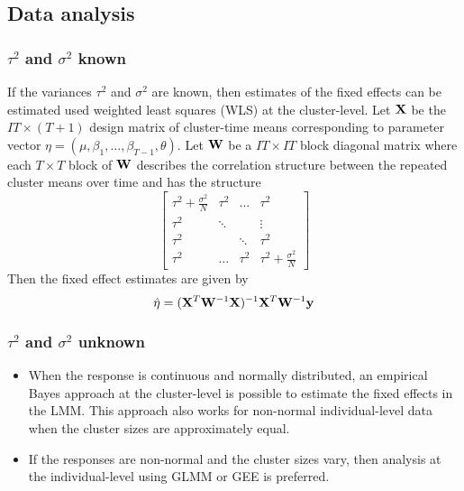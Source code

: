 \documentclass[10pt]{article}
\begin{document}
\subsection{Data analysis}

\subsubsection{$\tau^2$ and $\sigma^2$ known}

If the variances $\tau^2$ and $\sigma^2$ are known, then estimates of the fixed effects can be estimated used weighted least squares (WLS) at the cluster-level. Let $\mathbf{X}$ be the $IT\times(T+1)$ design matrix of cluster-time means corresponding to parameter vector $\eta=(\mu,\beta_1,\ldots,\beta_{T-1},\theta)$. Let $\mathbf{W}$ be a $IT\times IT$ block diagonal matrix where each $T\times T$ block of $\mathbf{W}$ describes the correlation structure between the repeated cluster means over time and has the structure
\[
\begin{bmatrix}
\tau^2 + \frac{\sigma^2}{N} & \tau^2 & \ldots & \tau^2 \\
\tau^2 & \ddots & & \vdots \\
\tau^2 & & \ddots & \tau^2 \\
\tau^2 & \ldots & \tau^2 & \tau^2 + \frac{\sigma^2}{N}
\end{bmatrix}
\]
Then the fixed effect estimates are given by
\[
\hat{\eta} = (\mathbf{X}^T\mathbf{W}^{-1}\mathbf{X})^{-1}\mathbf{X}^T\mathbf{W}^{-1}\mathbf{y}
\]

\subsubsection{$\tau^2$ and $\sigma^2$ unknown}

\begin{itemize}

\item
When the response is continuous and normally distributed, an empirical Bayes approach at the cluster-level is possible to estimate the fixed effects in the LMM. This approach also works for non-normal individual-level data when the cluster sizes are approximately equal.

\item
If the responses are non-normal and the cluster sizes vary, then analysis at the individual-level using GLMM or GEE is preferred.

\end{itemize}
\end{document}
